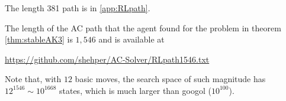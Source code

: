 The length 381 path is in \autoref{app:RLpath}.


The length of the AC path that the agent found for the problem in theorem \ref{thm:stableAK3} is $1,546$ and is available at
\begin{center}
	\href{https://github.com/shehper/AC-Solver/RLpath1546.txt}{https://github.com/shehper/AC-Solver/RLpath1546.txt}
\end{center}
Note that, with $12$ basic moves, the search space of such magnitude has $12^{1546} \sim 10^{1668}$ states, which is much larger than googol ($10^{100}$).